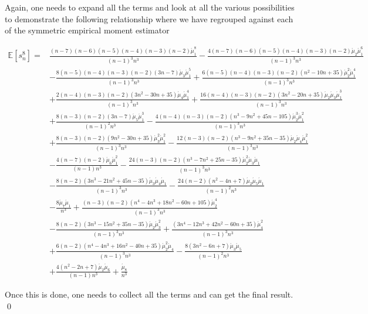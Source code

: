 \documentclass{imsart}
\numberwithin{equation}{section}
\theoremstyle{plain}
\theoremstyle{remark}
\begin{document}
Again, one needs to expand all the terms and look at all the various possibilities to demonstrate the following relationship where we have regrouped against each of the symmetric empirical moment estimator

\begin{footnotesize}
\begin{align} 
\mathbb{E}[ s_n^8 ] =   & \frac{(n-7) (n-6) (n-5) (n-4) (n-3) (n-2) \acute{\mu }_1^8}{(n-1)^3 n^3} 
-\frac{4 (n-7) (n-6) (n-5) (n-4) (n-3) (n-2) \acute{\mu }_2 \acute{\mu }_1^6}{(n-1)^3 n^3} \nonumber \\ &
-\frac{8 (n-5) (n-4) (n-3) (n-2) (3 n-7) \acute{\mu }_3 \acute{\mu }_1^5}{(n-1)^3 n^3} 
+\frac{6 (n-5) (n-4) (n-3) (n-2) \left(n^2-10 n+35\right) \acute{\mu }_2^2 \acute{\mu }_1^4}{(n-1)^3 n^3} \nonumber \\ &
+\frac{2 (n-4) (n-3) (n-2) \left(3 n^2-30 n+35\right) \acute{\mu }_4 \acute{\mu }_1^4}{(n-1)^3 n^3} 
+\frac{16 (n-4) (n-3) (n-2) \left(3 n^2-20 n+35\right) \acute{\mu }_2 \acute{\mu }_3 \acute{\mu }_1^3}{(n-1)^3 n^3} \nonumber \\ &
+\frac{8 (n-3) (n-2) (3 n-7) \acute{\mu }_5 \acute{\mu }_1^3}{(n-1)^2 n^3} 
-\frac{4 (n-4) (n-3) (n-2) \left(n^3-9 n^2+45 n-105\right) \acute{\mu }_2^3 \acute{\mu }_1^2}{(n-1)^3 n^3} \nonumber \\ &
+\frac{8 (n-3) (n-2) \left(9 n^2-30 n+35\right) \acute{\mu }_3^2 \acute{\mu }_1^2}{(n-1)^3 n^3} 
-\frac{12 (n-3) (n-2) \left(n^3-9 n^2+35 n-35\right) \acute{\mu }_2 \acute{\mu }_4 \acute{\mu }_1^2}{(n-1)^3 n^3} \nonumber \\ &
-\frac{4 (n-7) (n-2) \acute{\mu }_6 \acute{\mu }_1^2}{(n-1) n^3} 
-\frac{24 (n-3) (n-2) \left(n^3-7 n^2+25 n-35\right) \acute{\mu }_2^2 \acute{\mu }_3 \acute{\mu }_1}{(n-1)^3 n^3} \nonumber \\ &
-\frac{8 (n-2) \left(3 n^3-21 n^2+45 n-35\right) \acute{\mu }_3 \acute{\mu }_4 \acute{\mu }_1}{(n-1)^3 n^3} 
-\frac{24 (n-2) \left(n^2-4 n+7\right) \acute{\mu }_2 \acute{\mu }_5 \acute{\mu }_1}{(n-1)^2 n^3} \nonumber \\ &
-\frac{8 \acute{\mu }_7 \acute{\mu }_1}{n^3} 
+\frac{(n-3) (n-2) \left(n^4-4 n^3+18 n^2-60 n+105\right) \acute{\mu }_2^4}{(n-1)^3 n^3} \nonumber \\ &
-\frac{8 (n-2) \left(3 n^3-15 n^2+35 n-35\right) \acute{\mu }_2 \acute{\mu }_3^2}{(n-1)^3 n^3} 
+\frac{\left(3 n^4-12 n^3+42 n^2-60 n+35\right) \acute{\mu }_4^2}{(n-1)^3 n^3} \nonumber \\ &
+\frac{6 (n-2) \left(n^4-4 n^3+16 n^2-40 n+35\right) \acute{\mu }_2^2 \acute{\mu }_4}{(n-1)^3 n^3} 
-\frac{8 \left(3 n^2-6 n+7\right) \acute{\mu }_3 \acute{\mu }_5}{(n-1)^2 n^3} \nonumber \\ &
+\frac{4 \left(n^2-2 n+7\right) \acute{\mu }_2 \acute{\mu }_6}{(n-1) n^3} 
+\frac{\acute{\mu }_8}{n^3}
\end{align}
\end{footnotesize}



Once this is done, one needs to collect all the terms and can get the final result. \qed

\clearpage


\end{document}
